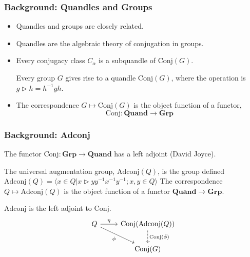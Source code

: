 \documentclass[10pt]{beamer}
\newcommand{\Conj}{\mathrm{Conj}} %
\newcommand{\thru}{\rhd} %
\newcommand{\Adconj}{\mathrm{Adconj}} %
\newcommand{\inv}[1]{#1^{-1}}
\theoremstyle{plain}
\begin{document}
    \begin{frame}
        \frametitle{Background: Quandles and Groups}

        \begin{itemize}
            \item Quandles and groups are closely related.

            \pause

            \item Quandles are the algebraic theory of conjugation in groups.

            \pause

            \item Every conjugacy class $C_\alpha$ is a subquandle of $\Conj(G)$.
            \begin{definition}
            Every group $G$ gives rise to a quandle $\Conj(G)$, where the operation is $ g\thru h = \inv{h}gh $.
            \end{definition}

            \item The correspondence $G\mapsto \Conj(G)$ is the object function of a functor,
            \[
                \Conj:\mathbf{Quand} \to \mathbf{Grp}
                \]

        \end{itemize}

    \end{frame}

    \begin{frame}[fragile]
        \frametitle{Background: Adconj}

        \begin{theorem}\cite{joyce1982classifying}
        The functor $ \Conj:\mathbf{Grp} \to \mathbf{Quand} $ has a left adjoint (David Joyce).
        \end{theorem}

        \begin{definition}
            The universal augmentation group, $\Adconj(Q)$, is the group defined $ \Adconj(Q) = \langle x\in Q| x\thru y \inv{y}\inv{x}\inv{y};x,y\in Q \rangle $
            The correspondence $Q\mapsto \Adconj(Q)$ is the object function of a functor $\mathbf{Quand}\to \mathbf{Grp}$.
        \end{definition}
    \begin{theorem}
        $\Adconj$ is the left adjoint to $\Conj$.
        \[\begin{tikzcd}
            Q & \Conj(\Adconj(Q)) \\
            & \Conj(G)
            \arrow["\eta",from=1-1, to=1-2]
            \arrow["\phi"',from=1-1, to=2-2]
            \arrow["\Conj(\tilde{\phi})",dashed,from=1-2, to=2-2]
        \end{tikzcd}\]
    \end{theorem}

    \end{frame}
\end{document}
